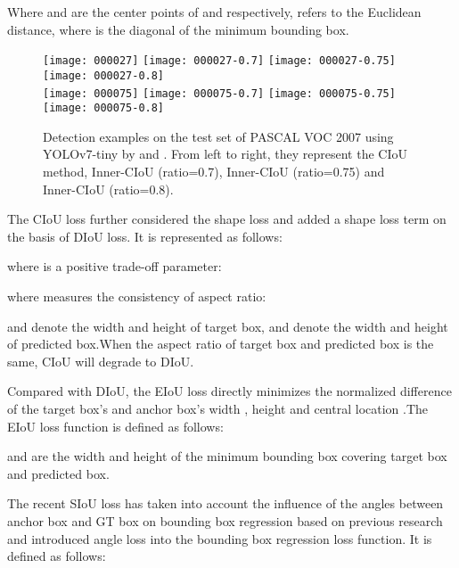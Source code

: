 \documentclass[lettersize,journal]{IEEEtran}
\begin{document}
	Where  and   are the center points of  and  respectively,   refers to the Euclidean distance, where  is the diagonal of the minimum bounding box.
	\begin{figure*} [h]
		\centering
			\texttt{[image: 000027]}
		\hspace{0.1cm}
		\vspace{0.4cm}
			\texttt{[image: 000027-0.7]}
		\hspace{0.1cm}
			\texttt{[image: 000027-0.75]}
		\hspace{0.1cm}
			\texttt{[image: 000027-0.8]}
		\\
		\centering
			\texttt{[image: 000075]} 
		\hspace{0.05cm}
			\texttt{[image: 000075-0.7]}
		\hspace{0.1cm}
			\texttt{[image: 000075-0.75]}
		\hspace{0.1cm}
			\texttt{[image: 000075-0.8]}
		\caption{Detection examples on the test set of PASCAL VOC 2007 using YOLOv7-tiny by  and . From left to right, they represent the CIoU method, Inner-CIoU (ratio=0.7), Inner-CIoU (ratio=0.75) and Inner-CIoU (ratio=0.8). }
		\label{fig_2} 
	\end{figure*}
	\par The CIoU loss\cite{ref3} further considered the shape loss and added a shape loss term on the basis of DIoU loss. It is represented as follows:
	
	where  is a positive trade-off parameter:
	
	where  measures the consistency of aspect ratio:
	
	 and  denote the width and height of target box, and  denote the width and height of predicted box.When the aspect ratio of target box and predicted box is the same, CIoU will degrade to DIoU.
	\par Compared with DIoU, the EIoU loss\cite{ref4} directly minimizes the normalized difference of the target box's and anchor box's width , height  and central location .The EIoU loss function\cite{ref4} is defined as follows:
	
	  and are the width and height of the minimum bounding box covering target box and predicted box. 
	\par The recent SIoU loss\cite{ref5} has taken into account the influence of the angles between anchor box and GT box on bounding box regression based on previous research and introduced angle loss into the bounding box regression loss function. It is defined as follows:
\end{document}
